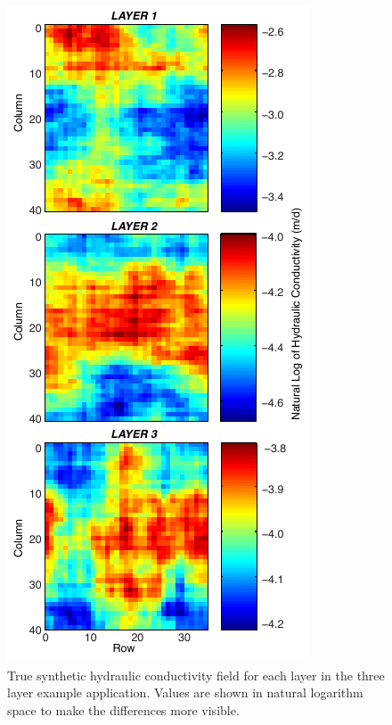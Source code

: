 \documentclass[11pt,oneside,onecolumn]{usgsreport}
\begin{document}
\begin{appendix}
\begin{figure}[!t]
\begin{center}\includegraphics{figures/3_layer_TRUE_K_field}\end{center}

\caption{\label{3Ltruek}True synthetic hydraulic conductivity field for each
layer in the three layer example application. Values are shown in
natural logarithm space to make the differences more visible.}


\end{figure}



\end{appendix}
\end{document}
